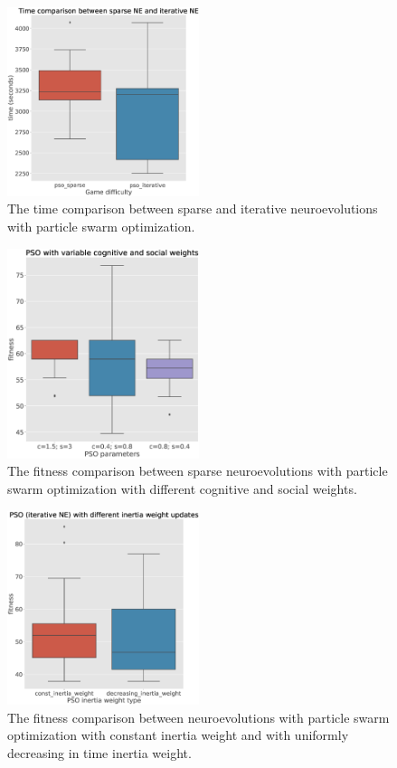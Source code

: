\documentclass[conference]{IEEEtran}
\begin{document}
\begin{figure}[!h]
    \centering
    \includegraphics[width=0.5\textwidth]{images/pso_sparse_vs_iterative_time.eps}
    \caption{The time comparison between sparse and iterative neuroevolutions with particle swarm optimization.}
    \label{fig:pso_sparse_vs_iterative_time}
\end{figure}


\begin{figure}[!h]
    \centering
    \includegraphics[width=0.5\textwidth]{images/pso_configs.eps}
    \caption{The fitness comparison between sparse neuroevolutions with particle swarm optimization
    with different cognitive and social weights.}
    \label{fig:pso_configs}
\end{figure}


\begin{figure}[!h]
    \centering
    \includegraphics[width=0.5\textwidth]{images/pso_inertia.eps}
    \caption{The fitness comparison between neuroevolutions with particle swarm optimization with constant inertia
    weight and with uniformly decreasing in time inertia weight.}
    \label{fig:pso_inertia}
\end{figure}
\end{document}

